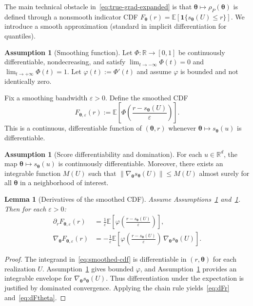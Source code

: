 \documentclass[11pt]{article}
\newcommand{\R}{\mathbb{R}}
\newcommand{\E}{\mathbb{E}}
\newcommand{\norm}[1]{\left\|#1\right\|}
\newcommand{\btheta}{\bm{\theta}}
\theoremstyle{plain}
\newtheorem{lemma}[theorem]{Lemma}
\theoremstyle{definition}
\newtheorem{assumption}[theorem]{Assumption}
\begin{document}
The main technical obstacle in~\eqref{eq:true-grad-expanded} is that $\btheta\mapsto \rho_P(\btheta)$ is defined through a nonsmooth indicator CDF $F_{\btheta}(r)=\E[\mathbf{1}\{s_{\btheta}(U)\le r\}]$.
We introduce a smooth approximation (standard in implicit differentiation for quantiles).

\begin{assumption}[Smoothing function]\label{asm:smoothing}
Let $\Phi:\R\to[0,1]$ be continuously differentiable, nondecreasing, and satisfy
$\lim_{t\to-\infty}\Phi(t)=0$ and $\lim_{t\to+\infty}\Phi(t)=1$.
Let $\varphi(t):=\Phi'(t)$ and assume $\varphi$ is bounded and not identically zero.
\end{assumption}

Fix a smoothing bandwidth $\varepsilon>0$.
Define the smoothed CDF
\begin{equation}\label{eq:smoothed-cdf}
F_{\btheta,\varepsilon}(r)
:=
\E\left[\Phi\left(\frac{r-s_{\btheta}(U)}{\varepsilon}\right)\right].
\end{equation}
This is a continuous, differentiable function of $(\btheta,r)$ whenever $\btheta\mapsto s_{\btheta}(u)$ is differentiable.

\begin{assumption}[Score differentiability and domination]\label{asm:score-diff}
For each $u\in\R^d$, the map $\btheta\mapsto s_{\btheta}(u)$ is continuously differentiable.
Moreover, there exists an integrable function $M(U)$ such that $\norm{\nabla_{\btheta}s_{\btheta}(U)}\le M(U)$ almost surely for all $\btheta$ in a neighborhood of interest.
\end{assumption}

\begin{lemma}[Derivatives of the smoothed CDF]\label{lem:smoothed-derivatives}
Assume Assumptions~\ref{asm:smoothing} and~\ref{asm:score-diff}. Then for each $\varepsilon>0$:
\begin{align}
\partial_r F_{\btheta,\varepsilon}(r)
&=
\frac{1}{\varepsilon}\E\left[\varphi\left(\frac{r-s_{\btheta}(U)}{\varepsilon}\right)\right],\label{eq:dFr}\\
\nabla_{\btheta}F_{\btheta,\varepsilon}(r)
&=
-\frac{1}{\varepsilon}\E\left[\varphi\left(\frac{r-s_{\btheta}(U)}{\varepsilon}\right)\,\nabla_{\btheta}s_{\btheta}(U)\right].\label{eq:dFtheta}
\end{align}
\end{lemma}

\begin{proof}
The integrand in~\eqref{eq:smoothed-cdf} is differentiable in $(r,\btheta)$ for each realization $U$.
Assumption~\ref{asm:smoothing} gives bounded $\varphi$, and Assumption~\ref{asm:score-diff} provides an integrable envelope for $\nabla_{\btheta}s_{\btheta}(U)$.
Thus differentiation under the expectation is justified by dominated convergence.
Applying the chain rule yields~\eqref{eq:dFr} and~\eqref{eq:dFtheta}.
\end{proof}
\end{document}
